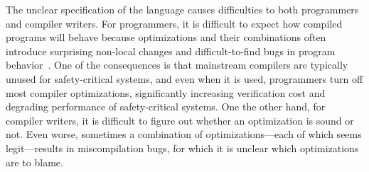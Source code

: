 The unclear specification of the language causes difficulties to both programmers and compiler
writers.  For programmers, it is difficult to expect how compiled programs will behave because
optimizations and their combinations often introduce surprising non-local changes and
difficult-to-find bugs in program behavior~\cite{wang2013towards,yang2011finding}.  One of the
consequences is that mainstream compilers are typically unused for safety-critical systems, and even
when it is used, programmers turn off most compiler optimizations, significantly increasing
verification cost and degrading performance of safety-critical systems.  One the other hand, for
compiler writers, it is difficult to figure out whether an optimization is sound or not.  Even
worse, sometimes a combination of optimizations---each of which seems legit---results in
miscompilation bugs, for which it is unclear which optimizations are to blame.







